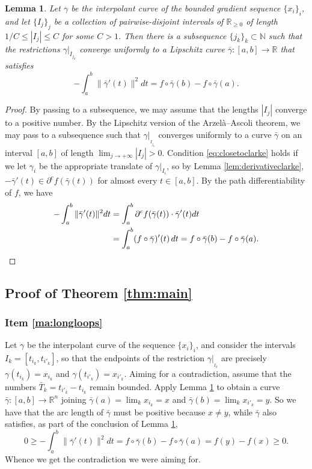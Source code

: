 \documentclass[11pt]{article}
\newtheorem{lem}[thm]{Lemma}
\theoremstyle{definition}
\theoremstyle{remark}
\newcommand{\R}{\mathbb{R}}
\newcommand{\N}{\mathbb{N}}
\renewcommand{\geq}{\geqslant}
\renewcommand{\leq}{\leqslant}
\begin{document}
\begin{lem}\label{lem:generaltechnique}
 Let $\gamma$ be the interpolant curve of the bounded gradient sequence $\{x_i\}_i$, and let $\{I_j\}_j$ be a collection of pairwise-disjoint intervals of $\R_{\geq0}$ of  length $1/C \leq |I_j| \leq C$ for some $C>1$. 
 Then there is a subsequence $\{j_k\}_k\subset\N$ such that the restrictions $\gamma|_{I_{j_k}}$ converge uniformly to a Lipschitz curve $\bar\gamma\colon[a,b]\to\R$ that satisfies
 \[-\int_a^b\|\bar\gamma'(t)\|^2dt=f\circ\bar\gamma(b)-f\circ\bar\gamma(a).\]
\end{lem}
\begin{proof}
 By passing to a subsequence, we may assume that the lengths $|I_j|$ converge to a positive number. 
 By the Lipschitz version of the Arzel\`a--Ascoli theorem, we may pass to a subsequence such that $\gamma|_{_{I_{j_k}}}$ converges uniformly to a curve $\bar \gamma$ on an interval $[a,b]$ of length $\lim_{j\to+\infty}|I_j|>0$. Condition \ref{eq:closetoclarke} holds if we let $\gamma_i$ be the appropriate translate of $\gamma|_{I_i}$, so by Lemma \ref{lem:derivativeclarke}, $-\bar\gamma'(t)\in\partial^cf(\bar\gamma(t))$ for almost every $t\in[a,b]$. By the path differentiability of $f$, we have
 \begin{align*}
  -\int_a^b\|\bar\gamma'(t)\|^2dt&=\int_a^b\partial^cf(\bar\gamma(t))\cdot\bar\gamma'(t)dt\\
  &=\int_a^b(f\circ\bar\gamma)'(t)\,dt=f\circ\bar\gamma(b)-f\circ\bar\gamma(a). \qedhere
 \end{align*}
\end{proof}


\subsection{Proof of Theorem \ref{thm:main}}
\label{sec:proofmain}

%
%
%
%
%
%
  

%
%
%
%
%
%
%
%
%
%
%

\subsubsection{Item \ref{ma:longloops}}
\label{sec:proofmain0}
Let $\gamma$ be the interpolant curve of the sequence $\{x_i\}_i$, and consider the intervals $I_k=[t_{i_k},t_{i'_k}]$, so that the endpoints of the restriction $\gamma|_{_{I_k}}$ are precisely $\gamma(t_{i_k})=x_{i_k}$ and $\gamma(t_{i'
_k})=x_{i'_k}$. Aiming for a contradiction, assume that the numbers $\bar T_k=t_{i'_k}-t_{i_k}$ remain bounded. Apply Lemma \ref{lem:generaltechnique} to obtain a curve $\bar\gamma\colon[a,b]\to\R^n$ joining $\bar\gamma(a)=\lim_kx_{i_k}=x$ and $\bar\gamma(b)=\lim_kx_{i'_k}=y$. So we have that the arc length of $\bar\gamma$ must be positive because $x\neq y$, while $\bar\gamma$ also satisfies, as part of the conclusion of Lemma \ref{lem:generaltechnique},
\[0\geq -\int_a^b\|\bar\gamma'(t)\|^2dt=f\circ\bar\gamma(b)-f\circ\bar\gamma(a)=f(y)-f(x)\geq0.\]
Whence we get the contradiction we were aiming for.
\end{document}
